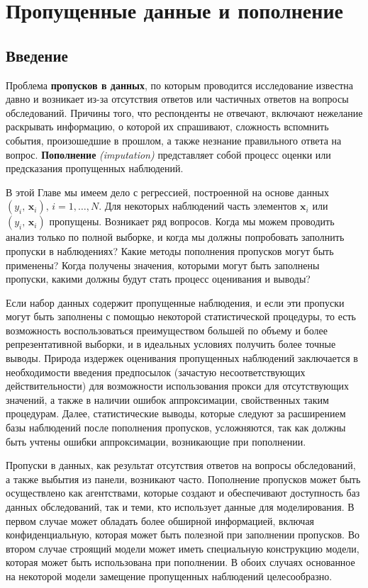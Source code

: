 

\chapter{Пропущенные данные и пополнение}
\section{Введение}
Проблема {\bf пропусков в данных}, по которым проводится исследование известна давно и возникает из-за отсутствия ответов или частичных ответов на вопросы обследований. Причины того, что респонденты не отвечают, включают нежелание раскрывать информацию, о которой их спрашивают, сложность вспомнить события, произошедшие в прошлом, а также незнание правильного ответа на вопрос. {\bf Пополнение} \emph{(imputation)} представляет собой процесс оценки или предсказания пропущенных наблюдений.

В этой Главе мы имеем дело с регрессией, построенной на основе  данных $(y_i, \, \mathbf{x}_i), \, i=1,\dots, N$. Для некоторых наблюдений часть элементов $\mathbf{x}_i$ или  $(y_i, \, \mathbf{x}_i)$ пропущены. Возникает ряд вопросов. Когда мы можем проводить анализ только по полной выборке, и когда мы должны попробовать заполнить пропуски в наблюдениях? Какие методы пополнения пропусков могут быть применены? Когда получены значения, которыми могут быть заполнены пропуски, какими должны будут стать процесс оценивания и выводы?

Если набор данных содержит пропущенные наблюдения, и если эти пропуски могут быть заполнены с помощью некоторой статистической процедуры,  то есть возможность воспользоваться преимуществом большей по объему и более репрезентативной выборки, и в идеальных условиях получить более точные выводы. Природа издержек оценивания пропущенных наблюдений заключается в необходимости введения предпосылок (зачастую несоответствующих действительности) для возможности использования прокси для отсутствующих значений, а также в наличии ошибок аппроксимации, свойственных таким процедурам. Далее, статистические выводы, которые следуют за расширением базы наблюдений после пополнения пропусков, усложняются, так как должны быть учтены ошибки аппроксимации, возникающие при пополнении. 

Пропуски в данных, как результат отсутствия ответов на вопросы обследований, а также выбытия из панели, возникают часто. Пополнение пропусков может быть осуществлено как агентствами, которые создают и обеспечивают доступность баз данных обследований, так и теми, кто использует данные для моделирования. В первом случае может обладать более обширной информацией, включая конфиденциальную, которая может быть полезной при заполнении пропусков. Во втором случае строящий модели может иметь специальную конструкцию модели, которая может быть использована при пополнении. В обоих случаях основанное на некоторой модели замещение пропущенных наблюдений целесообразно.

